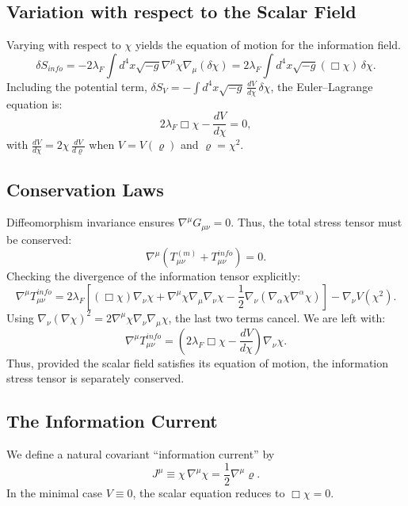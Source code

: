 \subsection{Variation with respect to the Scalar Field}
Varying with respect to $\chi$ yields the equation of motion for the information field.
\begin{equation}
    \delta S_{info} = -2\lambda_F \int d^4x \sqrt{-g} \nabla^\mu \chi \nabla_\mu (\delta \chi)
    = 2\lambda_F \int d^4x \sqrt{-g} (\Box \chi)\, \delta \chi.
\end{equation}
Including the potential term, $\delta S_V = -\int d^4x \sqrt{-g}\, \frac{dV}{d\chi}\, \delta\chi$, the Euler--Lagrange equation is:
\begin{equation}
    2\lambda_F \Box \chi - \frac{dV}{d\chi} = 0,
\end{equation}
with $\frac{dV}{d\chi} = 2\chi\,\frac{dV}{d\varrho}$ when $V=V(\varrho)$ and $\varrho=\chi^2$.

\subsection{Conservation Laws}
Diffeomorphism invariance ensures $\nabla^\mu G_{\mu\nu} = 0$. Thus, the total stress tensor must be conserved:
\begin{equation}
    \nabla^\mu (T_{\mu\nu}^{(m)} + T_{\mu\nu}^{info}) = 0.
\end{equation}
Checking the divergence of the information tensor explicitly:
\begin{equation}
    \nabla^\mu T_{\mu\nu}^{info} = 2\lambda_F [ (\Box \chi) \nabla_\nu \chi + \nabla^\mu \chi \nabla_\mu \nabla_\nu \chi - \frac{1}{2} \nabla_\nu (\nabla_\alpha \chi \nabla^\alpha \chi) ] - \nabla_\nu V(\chi^2).
\end{equation}
Using $\nabla_\nu (\nabla \chi)^2 = 2 \nabla^\mu \chi \nabla_\nu \nabla_\mu \chi$, the last two terms cancel. We are left with:
\begin{equation}
    \nabla^\mu T_{\mu\nu}^{info} = \left( 2\lambda_F \Box \chi - \frac{dV}{d\chi} \right) \nabla_\nu \chi.
\end{equation}
Thus, provided the scalar field satisfies its equation of motion, the information stress tensor is separately conserved.

\subsection{The Information Current}
We define a natural covariant ``information current'' by
\begin{equation}
    J^\mu \equiv \chi\, \nabla^\mu \chi = \frac{1}{2}\nabla^\mu \varrho.
\end{equation}
In the minimal case $V\equiv 0$, the scalar equation reduces to $\Box \chi = 0$.


